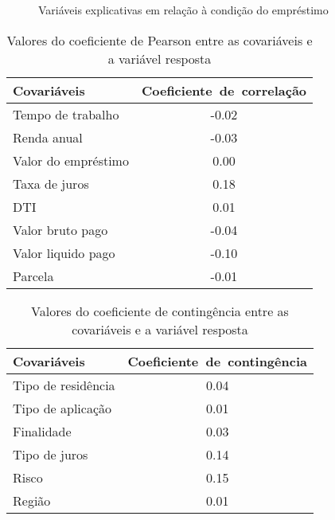 \begin{figure}[H]
  \centering
  \vspace{.5cm}
  \vspace{.5cm}

  \label{fig:exp_bar2}
  \caption{Variáveis explicativas em relação à condição do empréstimo}
\end{figure}


\begin{table}[H]
  \centering
  \begin{tabular}{lc}
    \hline
    \textbf{Covariáveis} & \mbox{\textbf{Coeficiente de correlação}} \\ 
    \hline
    Tempo de trabalho & -0.02 \\ 
    Renda anual & -0.03 \\ 
    Valor do empréstimo & 0.00 \\ 
    Taxa de juros & 0.18 \\ 
    DTI & 0.01 \\ 
    Valor bruto pago & -0.04 \\ 
    Valor liquido pago & -0.10 \\ 
    Parcela & -0.01 \\ 
    \hline
  \end{tabular}
  \caption{Valores do coeficiente de Pearson entre as covariáveis e a variável resposta}
  \label{tab:coef_corr}
  \end{table}
  
\begin{table}[H]
  \centering
  \begin{tabular}{lc}
    \hline
    \textbf{Covariáveis} & \mbox{\textbf{Coeficiente de contingência}} \\ 
    \hline
    Tipo de residência & 0.04 \\ 
    Tipo de aplicação & 0.01 \\ 
    Finalidade & 0.03 \\ 
    Tipo de juros & 0.14 \\ 
    Risco & 0.15 \\ 
    Região & 0.01 \\ 
     \hline
  \end{tabular}
  \caption{Valores do coeficiente de contingência entre as covariáveis e a variável resposta}
  \label{tab:coef_cont}
\end{table}

